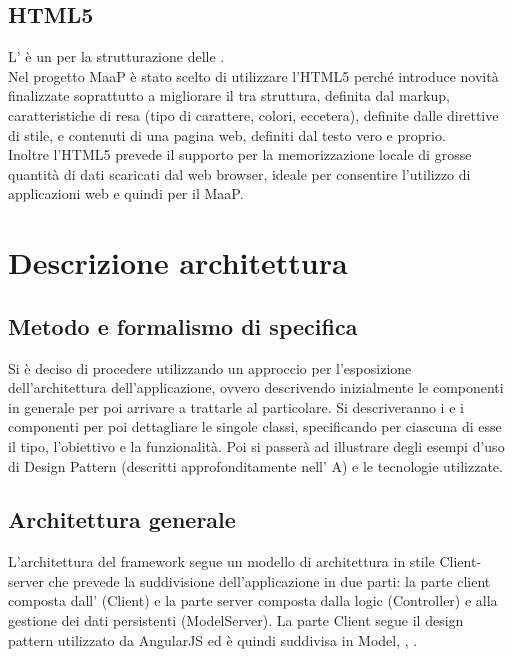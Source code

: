 \subsection{HTML5}
L' è un  per la strutturazione delle .\\
Nel progetto MaaP è stato scelto di utilizzare l'HTML5 perché introduce novità finalizzate soprattutto a migliorare il  tra struttura, definita dal markup, caratteristiche di resa (tipo di carattere, colori, eccetera), definite dalle direttive di stile, e contenuti di una pagina web, definiti dal testo vero e proprio.\\
Inoltre l'HTML5 prevede il supporto per la memorizzazione locale di grosse quantità di dati scaricati dal web browser, ideale per consentire l'utilizzo di applicazioni web e quindi per il  MaaP.

\newpage
\section{Descrizione architettura}
\subsection{Metodo e formalismo di specifica}
Si è deciso di procedere utilizzando un approccio  per l'esposizione dell'architettura dell'applicazione, ovvero descrivendo inizialmente le componenti in generale per poi arrivare a trattarle al particolare.
Si descriveranno i  e i componenti per poi dettagliare le singole classi, specificando per ciascuna di esse il tipo, l'obiettivo e la funzionalità. Poi si passerà ad illustrare degli esempi d'uso di Design Pattern (descritti approfonditamente nell' A) e le tecnologie utilizzate.


\subsection{Architettura generale}
L'architettura del framework segue un modello di architettura in stile Client-server che prevede la suddivisione dell'applicazione  in due parti: la parte client composta dall'  (Client) e la parte server composta dalla  logic (Controller) e alla gestione dei dati persistenti (ModelServer). La parte Client segue il design pattern  utilizzato da AngularJS ed è quindi suddivisa in Model, , .\\

